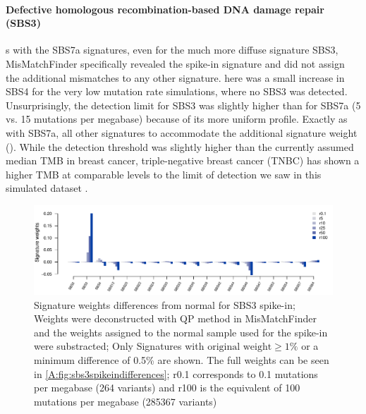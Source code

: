 \paragraph{Defective homologous recombination-based DNA damage repair (SBS3)}
\label{mmf-sec:mbcSim}

s with the SBS7a signatures, even for the much more diffuse signature SBS3, MisMatchFinder specifically revealed the spike-in signature and did not assign the additional mismatches to any other signature. here was a small increase in SBS4 for the very low mutation rate simulations, where no SBS3 was detected. Unsurprisingly, the detection limit for SBS3 was slightly higher than for SBS7a (5 vs. 15 mutations per megabase) because of its more uniform profile. Exactly as with SBS7a, all other signatures  to accommodate the additional signature weight (). While the detection threshold was slightly higher than the currently assumed median TMB in breast cancer, triple-negative breast cancer (TNBC) has shown a higher TMB at comparable levels to the limit of detection we saw in this simulated dataset \cite{BarrosoSousa2020}.

\begin{figure}[ht]
\centering
\includegraphics[width=.99\linewidth]{Figures/MisMatchFinder/SBS3SpikeInSignatureDifferencesFocussed.pdf}
\caption[Signature weights differences from normal for SBS3 spike-in]{Signature weights differences from normal for SBS3 spike-in; Weights were deconstructed with QP method in MisMatchFinder and the weights assigned to the normal sample used for the spike-in were substracted; Only Signatures with $\text{original weight}\geq 1\%$ or a minimum difference of 0.5\% are shown. The full weights can be seen in \protect\autoref{A:fig:sbs3spikeindifferences}; r0.1 corresponds to 0.1 mutations per megabase (264 variants) and r100 is the equivalent of 100 mutations per megabase (285367 variants)}\label{fig:mmf-spikeSBS3signatures}
\end{figure}

